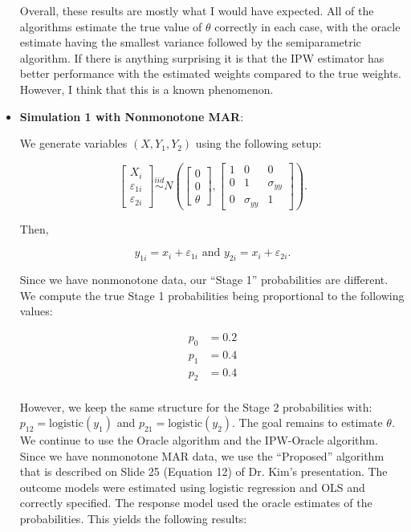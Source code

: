 \documentclass[12pt]{article}
\newcommand{\logistic}{{\text{logistic}}}
\begin{document}
\begin{itemize}
    \newpage 

    
    
    

    Overall, these results are mostly what I would have expected. All of the
    algorithms estimate the true value of $\theta$ correctly in each case, with
    the oracle estimate having the smallest variance followed by the
    semiparametric algorithm. If there is anything surprising it is that the IPW
    estimator has better performance with the estimated weights compared to the
    true weights. However, I think that this is a known phenomenon.

    \newpage 
    
    \item \textbf{Simulation 1 with Nonmonotone MAR}:

    We generate variables $(X, Y_1, Y_2)$ using the following setup:

    \[\begin{bmatrix}
    X_i \\ \varepsilon_{1i} \\ \varepsilon_{2i}
    \end{bmatrix} \stackrel{iid}{\sim}
    N\left(
    \begin{bmatrix}
        0 \\ 0 \\ \theta
    \end{bmatrix},
    \begin{bmatrix}
        1 & 0 & 0 \\
        0 & 1 & \sigma_{yy}\\
        0 & \sigma_{yy} & 1
    \end{bmatrix}
    \right).\]

    Then, 

    \[y_{1i} = x_i + \varepsilon_{1i} \text{ and } 
    y_{2i} = x_i + \varepsilon_{2i}.\]

    Since we have nonmonotone data, our ``Stage 1'' probabilities are
    different. We compute the true Stage 1 probabilities being proportional to
    the following values:
    
    \begin{align*}
        p_0 &= 0.2 \\
        p_1 &= 0.4 \\
        p_2 &= 0.4 \\
    \end{align*}
    
   However, we keep the same structure for the Stage 2 probabilities with:
   $p_{12} = \logistic(y_1)$ and $p_{21} = \logistic(y_2)$. The goal remains to
   estimate $\theta$. We continue to use the Oracle algorithm and the IPW-Oracle
   algorithm. Since we have nonmonotone MAR data, we use the ``Proposed''
   algorithm that is described on Slide 25 (Equation 12) of Dr. Kim's
   presentation. The outcome models were estimated using
   logistic regression and OLS and correctly specified. The response model used
   the oracle estimates of the probabilities. This yields the
   following results:
   

\end{itemize}
\end{document}
